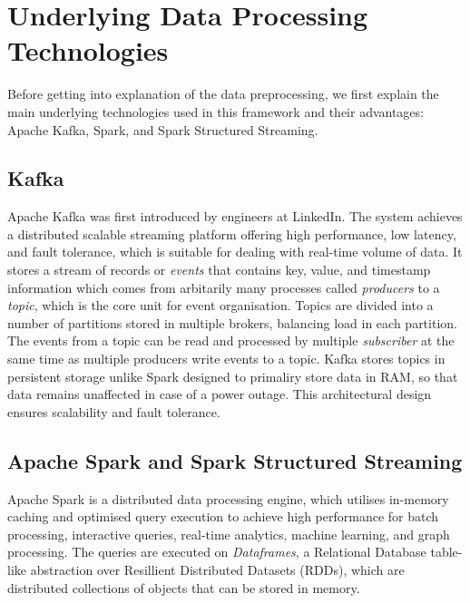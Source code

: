\documentclass[11pt]{uonthesis}
\begin{document}
\section{Underlying Data Processing Technologies}
Before getting into explanation of the data preprocessing, we first explain the main underlying technologies used in this framework and their advantages: Apache Kafka, Spark, and Spark Structured Streaming.

\subsection{Kafka}

Apache Kafka\cite{Kreps2011KafkaA} was first introduced by engineers at LinkedIn. The system achieves a distributed scalable streaming platform offering high performance, low latency, and fault tolerance, which is suitable for dealing with real-time volume of data. It stores a stream of records or \textit{events} that contains key, value, and timestamp information which comes from arbitarily many processes called \textit{producers} to a \textit{topic}, which is the core unit for event organisation. Topics are divided into a number of partitions stored in multiple brokers, balancing load in each partition. The events from a topic can be read and processed by multiple \textit{subscriber} at the same time as multiple producers write events to a topic. Kafka stores topics in persistent storage unlike Spark designed to primaliry store data in RAM, so that data remains unaffected in case of a power outage. This architectural design ensures scalability and fault tolerance. 

\subsection{Apache Spark and Spark Structured Streaming}

Apache Spark is a distributed data processing engine, which utilises in-memory caching and optimised query execution to achieve high performance for batch processing, interactive queries, real-time analytics, machine learning, and graph processing. The queries are executed on \textit{Dataframes}, a Relational Database table-like abstraction over Resillient Distributed Datasets (RDDs), which are distributed collections of objects that can be stored in memory.
\end{document}
